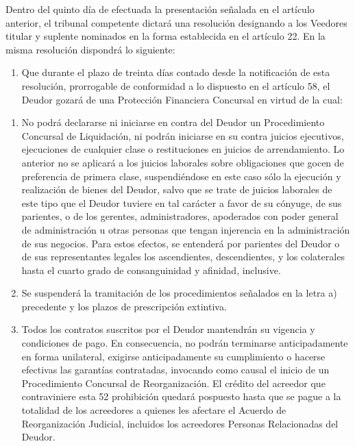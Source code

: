 \documentclass[
]{book}
\providecommand{\tightlist}{%
  \setlength{\itemsep}{0pt}\setlength{\parskip}{0pt}}
\begin{document}
Dentro del quinto día de efectuada la presentación señalada en el artículo anterior, el tribunal competente dictará una resolución designando a los Veedores titular y suplente nominados en la forma establecida en el artículo 22. En la misma resolución dispondrá lo siguiente:

\begin{enumerate}
\def\labelenumi{\arabic{enumi})}
\tightlist
\item
  Que durante el plazo de treinta días contado desde la notificación de esta resolución, prorrogable de conformidad a lo dispuesto en el artículo 58, el Deudor gozará de una Protección Financiera Concursal en virtud de la cual:
\end{enumerate}

\begin{enumerate}
\def\labelenumi{\alph{enumi})}
\item
  No podrá declararse ni iniciarse en contra del Deudor un Procedimiento Concursal de Liquidación, ni podrán iniciarse en su contra juicios ejecutivos, ejecuciones de cualquier clase o restituciones en juicios de arrendamiento. Lo anterior no se aplicará a los juicios laborales sobre obligaciones que gocen de preferencia de primera clase, suspendiéndose en este caso sólo la ejecución y realización de bienes del Deudor, salvo que se trate de juicios laborales de este tipo que el Deudor tuviere en tal carácter a favor de su cónyuge, de sus parientes, o de los gerentes, administradores, apoderados con poder general de administración u otras personas que tengan injerencia en la administración de sus negocios. Para estos efectos, se entenderá por parientes del Deudor o de sus representantes legales los ascendientes, descendientes, y los colaterales hasta el cuarto grado de consanguinidad y afinidad, inclusive.
\item
  Se suspenderá la tramitación de los procedimientos señalados en la letra a) precedente y los plazos de prescripción extintiva.
\item
  Todos los contratos suscritos por el Deudor mantendrán su vigencia y condiciones de pago. En consecuencia, no podrán terminarse anticipadamente en forma unilateral, exigirse anticipadamente su cumplimiento o hacerse efectivas las garantías contratadas, invocando como causal el inicio de un Procedimiento Concursal de Reorganización. El crédito del acreedor que contraviniere esta 52
  prohibición quedará pospuesto hasta que se pague a la totalidad de los acreedores a quienes les afectare el Acuerdo de Reorganización Judicial, incluidos los acreedores Personas Relacionadas del Deudor.
\end{enumerate}
\end{document}

